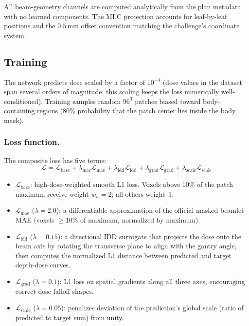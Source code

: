 \documentclass[runningheads]{llncs}
\begin{document}
All beam-geometry channels are computed analytically from the plan metadata with no learned components. The MLC projection accounts for leaf-by-leaf positions and the $0.5$\,mm offset convention matching the challenge's coordinate system.

\subsection{Training}

The network predicts dose scaled by a factor of $10^{-4}$ (dose values in the dataset span several orders of magnitude; this scaling keeps the loss numerically well-conditioned). Training samples random $96^3$ patches biased toward body-containing regions (80\% probability that the patch center lies inside the body mask).

\subsubsection{Loss function.}
The composite loss has five terms:
\begin{equation}
\mathcal{L} = \mathcal{L}_{\mathrm{base}} + \lambda_{\mathrm{mae}}\mathcal{L}_{\mathrm{mae}} + \lambda_{\mathrm{idd}}\mathcal{L}_{\mathrm{idd}} + \lambda_{\mathrm{grad}}\mathcal{L}_{\mathrm{grad}} + \lambda_{\mathrm{scale}}\mathcal{L}_{\mathrm{scale}}
\end{equation}
\begin{itemize}
\item $\mathcal{L}_{\mathrm{base}}$: high-dose-weighted smooth L1 loss. Voxels above 10\% of the patch maximum receive weight $w_h = 2$; all others weight~1.
\item $\mathcal{L}_{\mathrm{mae}}$ ($\lambda = 2.0$): a differentiable approximation of the official masked beamlet MAE (voxels $\geq$10\% of maximum, normalized by maximum).
\item $\mathcal{L}_{\mathrm{idd}}$ ($\lambda = 0.15$): a directional IDD surrogate that projects the dose onto the beam axis by rotating the transverse plane to align with the gantry angle, then computes the normalized L1 distance between predicted and target depth-dose curves.
\item $\mathcal{L}_{\mathrm{grad}}$ ($\lambda = 0.1$): L1 loss on spatial gradients along all three axes, encouraging correct dose falloff shapes.
\item $\mathcal{L}_{\mathrm{scale}}$ ($\lambda = 0.05$): penalizes deviation of the prediction's global scale (ratio of predicted to target sum) from unity.
\end{itemize}
\end{document}
